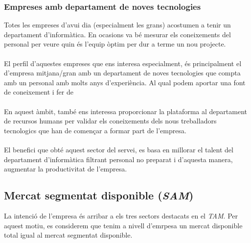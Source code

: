 \documentclass[12pt]{article}
\begin{document}
\subsubsection{Empreses amb departament de noves tecnologies}
Totes les empreses d'avui dia (especialment les grans) acostumen a tenir un departament d'informàtica. En ocasions va bé mesurar els coneixements del personal per veure quin és l'equip òptim per dur a terme un nou projecte.
\\\\El perfil d'aquestes empreses que ens interesa especialment, és principalment el d'empresa mitjana/gran amb un departament de noves tecnologies que compta amb un personal amb molts anys d'experiència. Al qual podem aportar una font de coneixement i fer de 
\\\\En aquest àmbit, també ens interessa proporcionar la plataforma al departament de recursos humans per validar els coneixements dels nous treballadors tecnologics que han de començar a formar part de l'empresa.
\\\\El benefici que obté aquest sector del servei, es basa en millorar el talent del departament d'informàtica filtrant personal no preparat i d'aquesta manera, augmentar la productivitat de l'empresa.

\subsection{Mercat segmentat disponible (\textit{SAM})}
La intenció de l'empresa és arribar a els tres sectors destacats en el \textit{TAM}. Per aquest motiu, es considerem que tenim a nivell d'emrpesa un mercat disponible total igual al mercat segmentat disponible.
\end{document}
